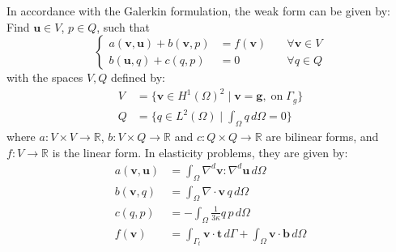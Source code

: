 In accordance with the Galerkin formulation, the weak form can be given by:
Find $\boldsymbol{u} \in V$, $p \in Q$, such that
\begin{equation}\label{weak_form}
\left\{
\begin{aligned}
a(\boldsymbol{v}, \boldsymbol{u}) + b(\boldsymbol{v}, p) &= f(\boldsymbol{v}) \quad &\forall \boldsymbol{v} \in V \\
b(\boldsymbol{u}, q) + c(q, p) &= 0 \quad &\forall q \in Q
\end{aligned}
\right.
\end{equation}
with the spaces $V, Q$ defined by:
\begin{align}\label{mix_formulation}
V &= \{\boldsymbol{v} \in H^1(\Omega)^2 \mid \boldsymbol{v} = \boldsymbol{g}, \; \textrm{on} \; \Gamma_g\}
\\
Q &= \{q \in L^2(\Omega) \mid \textstyle{\int_{\Omega}} q \, d\Omega = 0\}
\end{align}
where $a: V \times V \rightarrow \mathbb{R}$, $b: V \times Q \rightarrow \mathbb{R}$ and $c: Q \times Q \rightarrow \mathbb{R}$ are bilinear forms, and $f: V \rightarrow \mathbb{R}$ is the linear form. In elasticity problems, they are given by:
\begin{align}
a(\boldsymbol{v}, \boldsymbol{u}) &= \int_\Omega \nabla^d \boldsymbol{v} : \nabla^d \boldsymbol{u} \, d\Omega \\
\label{form_b}
b(\boldsymbol{v}, q) &= \int_\Omega \nabla \cdot \boldsymbol{v} \, q \, d\Omega \\
\label{form_c}
c(q, p) &= -\int_\Omega \frac{1}{3\kappa} q \, p \, d\Omega \\
f(\boldsymbol{v}) &= \int_{\Gamma_t} \boldsymbol{v} \cdot \boldsymbol{t} \, d\Gamma + \int_{\Omega} \boldsymbol{v} \cdot \boldsymbol{b} \, d\Omega
\end{align}

